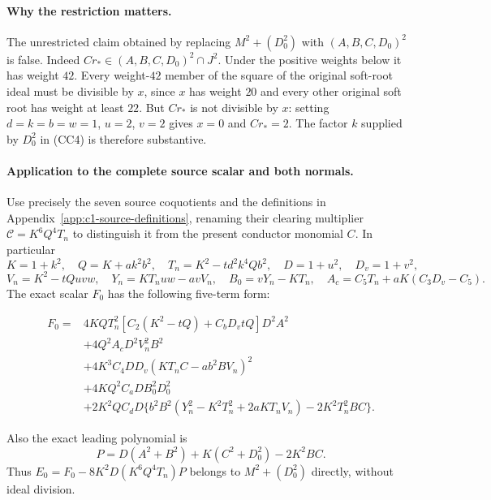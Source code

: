 \paragraph{Why the restriction matters.}
The unrestricted claim obtained by replacing $M^2+(D_0^2)$ with
$(A,B,C,D_0)^2$ is false. Indeed $Cr_*\in(A,B,C,D_0)^2\cap J^2$.
Under the positive weights below it has weight $42$. Every weight-$42$
member of the square of the original soft-root ideal must be divisible
by $x$, since $x$ has weight $20$ and every other original soft root has
weight at least $22$. But $Cr_*$ is not divisible by $x$: setting
$d=k=b=w=1$, $u=2$, $v=2$ gives $x=0$ and $Cr_*=2$.
The factor $k$ supplied by $D_0^2$ in (CC4) is therefore substantive.

\paragraph{Application to the complete source scalar and both normals.}
Use precisely the seven source coquotients and the definitions in
Appendix~\ref{app:c1-source-definitions}, renaming their clearing multiplier $\mathcal C=K^6Q^4T_n$
to distinguish it from the present conductor monomial $C$. In particular
\[
 K=1+k^2,\quad Q=K+ak^2b^2,\quad T_n=K^2-td^2k^4Qb^2,
 \quad D=1+u^2,\quad D_v=1+v^2,
\]
\[
 V_n=K^2-tQuvw,\quad Y_n=KT_nuw-avV_n,
 \quad B_0=vY_n-KT_n,
 \quad A_c=C_5T_n+aK(C_3D_v-C_5).
\]
The exact scalar $F_0$ has the following five-term form:
\begin{samepage}
\begin{align*}
F_0={}&4KQT_n^2[C_2(K^2-tQ)+C_bD_vtQ]D^2A^2\\
 &+4Q^2A_cD^2V_n^2B^2\\
 &+4K^3C_4DD_v(KT_nC-ab^2BV_n)^2\\
 &+4KQ^2C_aDB_0^2D_0^2\\
 &+2K^2QC_dD\{b^2B^2(Y_n^2-K^2T_n^2+2aKT_nV_n)
                         -2K^2T_n^2BC\}.
\end{align*}
\end{samepage}
Also the exact leading polynomial is
\[
 P=D(A^2+B^2)+K(C^2+D_0^2)-2K^2BC.
\]
Thus $E_0=F_0-8K^2D(K^6Q^4T_n)P$ belongs to
$M^2+(D_0^2)$ directly, without ideal division.

